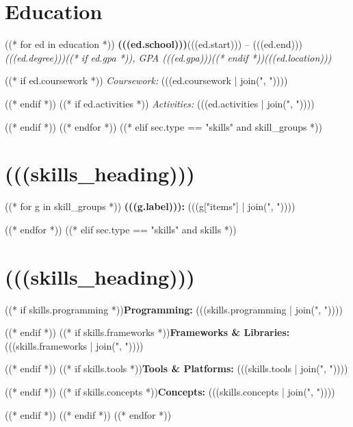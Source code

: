 \documentclass[10pt,letterpaper]{article}
\newcommand{\entry}[4]{%
  \noindent\textbf{#1}\hfill #2\\
  \textit{#3}\hfill\textit{#4}\par
}
\begin{document}
\section{Education}
((* for ed in education *))
\entry{(((ed.school)))}{(((ed.start))) -- (((ed.end)))}{(((ed.degree)))((* if ed.gpa *)), GPA (((ed.gpa)))((* endif *))}{(((ed.location)))}
((* if ed.coursework *))
\textit{Coursework:} (((ed.coursework | join(", ")))) \par
((* endif *))
((* if ed.activities *))
\textit{Activities:} (((ed.activities | join(", ")))) \par
((* endif *))
((* endfor *))
((* elif sec.type == "skills" and skill_groups *))
\section{(((skills_heading)))}
((* for g in skill_groups *))
\textbf{(((g.label))):} (((g["items"] | join(", "))))\par
((* endfor *))
((* elif sec.type == "skills" and skills *))
\section{(((skills_heading)))}
((* if skills.programming *))\textbf{Programming:} (((skills.programming | join(", "))))\par
((* endif *))
((* if skills.frameworks *))\textbf{Frameworks \& Libraries:} (((skills.frameworks | join(", "))))\par
((* endif *))
((* if skills.tools *))\textbf{Tools \& Platforms:} (((skills.tools | join(", "))))\par
((* endif *))
((* if skills.concepts *))\textbf{Concepts:} (((skills.concepts | join(", "))))\par
((* endif *))
((* endif *))
((* endfor *))
\end{document}
